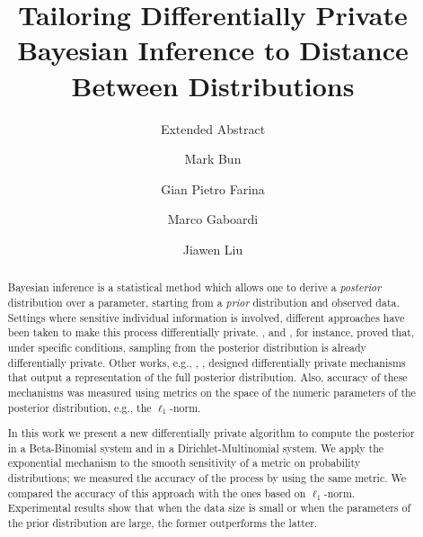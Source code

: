 \documentclass[sigconf]{acmart}
\begin{document}
\title{Tailoring Differentially Private Bayesian Inference to Distance Between Distributions}
\subtitle{Extended Abstract}


\author{Mark Bun}

\author{Gian Pietro Farina}


\author{Marco Gaboardi}

\author{Jiawen Liu}

\begin{abstract} Bayesian inference is a statistical method which
allows one to derive a \emph{posterior} distribution over a parameter,
starting from a \emph{prior} distribution and observed data. Settings
where sensitive individual information is involved, different
approaches have been taken to make this process differentially
private. \citet{dimitrakakis2014robust}, and \citet{wang2015privacy},
for instance, proved that, under specific conditions, sampling from
the posterior distribution is already differentially private. Other
works, e.g., \cite{zhang2016differential}, \cite{foulds2016theory},
designed differentially private mechanisms that output a
representation of the full posterior distribution. Also, accuracy of
these mechanisms was measured using metrics on the space of the
numeric parameters of the posterior distribution, e.g., the
$\ell_1$-norm.

In this work we present a new differentially private algorithm to
compute the posterior in a Beta-Binomial system and in a
Dirichlet-Multinomial system. We apply the exponential mechanism to
the smooth sensitivity of a metric on probability distributions; we
measured the accuracy of the process by using the same metric. We
compared the accuracy of this approach with the ones based on
$\ell_1$-norm. Experimental results show that when the data size is
small or when the parameters of the prior distribution are large, the
former outperforms the latter.

\end{abstract}


\end{document}

